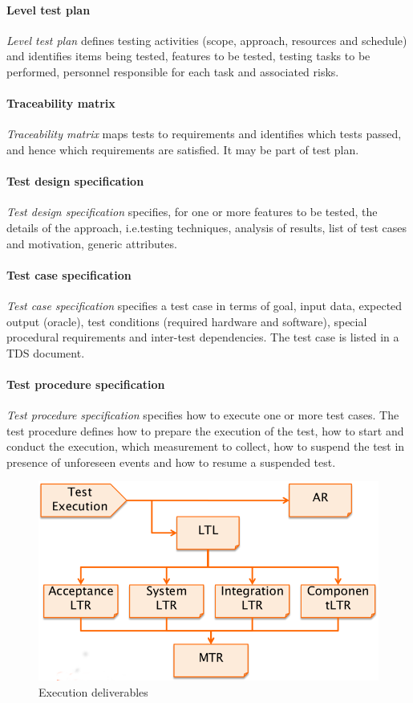 \paragraph{Level test plan}
\emph{Level test plan} defines testing activities (scope, approach, resources and schedule) and identifies items being tested, features to be tested, testing tasks to be performed, personnel responsible for each task and associated risks.

\paragraph{Traceability matrix}
\emph{Traceability matrix} maps tests to requirements and identifies which tests passed, and hence which requirements are satisfied. It may be part of test plan.

\paragraph{Test design specification}
\emph{Test design specification} specifies, for one or more features to be tested, the details of the approach, i.e.\@ testing techniques, analysis of results, list of test cases and motivation, generic attributes.

\paragraph{Test case specification}
\emph{Test case specification} specifies a test case in terms of goal, input data, expected output (oracle), test conditions (required hardware and software), special procedural requirements and inter-test dependencies. The test case is listed in a TDS document.

\paragraph{Test procedure specification}
\emph{Test procedure specification} specifies how to execute one or more test cases. The test procedure defines how to prepare the execution of the test, how to start and conduct the execution, which measurement to collect, how to suspend the test in presence of unforeseen events and how to resume a suspended test.

\begin{figure}[hbtp]
\centering
\includegraphics[scale=0.3]{images/deliverables_execution.png}
\caption{Execution deliverables}
\end{figure}

